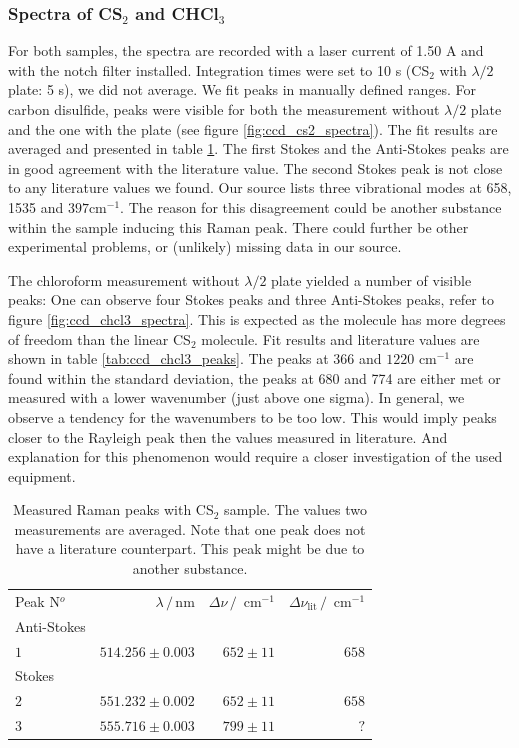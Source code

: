 \subsubsection{Spectra of CS$_2$ and CHCl$_3$}
For both samples, the spectra are recorded with a laser current of 1.50 A and with the notch filter installed. 
Integration times were set to 10 s (CS$_2$ with $\lambda / 2$ plate: 5 s), we did not average. We fit peaks in
manually defined ranges. For carbon disulfide, peaks were visible for both the measurement without $\lambda / 2$ 
plate and the one with the plate (see figure \ref{fig:ccd_cs2_spectra}). The fit results are averaged and presented 
in table \ref{tab:ccd_cs2_peaks}. The first Stokes and the Anti-Stokes peaks are in good agreement with the 
literature value. The second Stokes peak is not close to any literature values we found. Our source lists three
vibrational modes at 658, 1535 and $397 \text{cm}^{-1}$. The reason for this disagreement could be another 
substance within the sample inducing this Raman peak. There could further be other experimental problems, or
(unlikely) missing data in our source. 

The chloroform measurement without $\lambda / 2$ plate yielded a number of visible peaks: One can observe 
four Stokes peaks and three Anti-Stokes peaks, refer to figure \ref{fig:ccd_chcl3_spectra}. This is expected
as the molecule has more degrees of freedom than the linear CS$_2$ molecule. Fit results and literature 
values are shown in table \ref{tab:ccd_chcl3_peaks}. The peaks at 366 and $1220 \text{ cm}^{-1} $ are
found within the standard deviation, the peaks at 680 and 774 are either met or measured with a lower wavenumber
(just above one sigma). In general, we observe a tendency for the wavenumbers to be too low. This would imply
peaks closer to the Rayleigh peak then the values measured in literature. And explanation for this phenomenon 
would require a closer investigation of the used equipment. 
\begin{table}[htpb]
    \centering
    \caption{
        Measured Raman peaks with CS$_2$ sample. The values two measurements are averaged. 
        Note that one peak does not have a literature counterpart. This peak might be due to another 
        substance. 
        }
    \label{tab:ccd_cs2_peaks}
    \begin{tabular}{l r r r}
        \rowcolor{LightCyan} Peak N$^o$ & $\lambda \, / \, \text{nm}$ &
        $\Delta \nu \, / \, \text{ cm}^{-1}$ & 
        $\Delta \nu_\text{lit} \, / \, \text{ cm}^{-1}$ \\
        \cellcolor{LightCyan}Anti-Stokes &&& \\
        \cellcolor{LightCyan}$1$ & $514.256 \pm 0.003$ & $652 \pm 11$ & $658$   \\
        \cellcolor{LightCyan}Stokes &&& \\
        \cellcolor{LightCyan}$2$ & $551.232 \pm 0.002$ & $652 \pm 11$ & $658$   \\
        \cellcolor{LightCyan}$3$ & $555.716 \pm 0.003$ & $799 \pm 11$ & $?$  
    \end{tabular}
\end{table}

